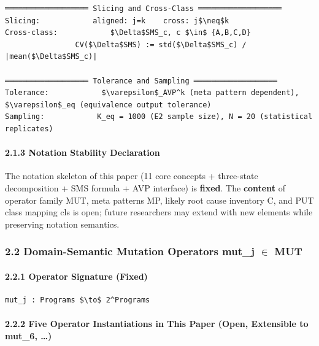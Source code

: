 \documentclass[review,12pt,authoryear]{elsarticle}
\begin{document}
\begin{verbatim}
═══════════════════ Slicing and Cross-Class ═══════════════════
Slicing:            aligned: j=k    cross: j$\neq$k
Cross-class:            $\Delta$SMS_c, c $\in$ {A,B,C,D}
                CV($\Delta$SMS) := std($\Delta$SMS_c) / |mean($\Delta$SMS_c)|

═══════════════════ Tolerance and Sampling ═══════════════════
Tolerance:            $\varepsilon$_AVP^k (meta pattern dependent), $\varepsilon$_eq (equivalence output tolerance)
Sampling:            K_eq = 1000 (E2 sample size), N = 20 (statistical replicates)
\end{verbatim}

\paragraph{2.1.3 Notation Stability
Declaration}\label{notation-stability-declaration}

The notation skeleton of this paper (11 core concepts + three-state
decomposition + SMS formula + AVP interface) is \textbf{fixed}. The
\textbf{content} of operator family MUT, meta patterns MP, likely root
cause inventory C, and PUT class mapping cls is open; future researchers
may extend with new elements while preserving notation semantics.

\subsubsection{2.2 Domain-Semantic Mutation Operators mut\_j $\in$
MUT}\label{domain-semantic-mutation-operators-mut_j-mut}

\paragraph{2.2.1 Operator Signature
(Fixed)}\label{operator-signature-fixed}

\begin{verbatim}
mut_j : Programs $\to$ 2^Programs
\end{verbatim}

\paragraph{2.2.2 Five Operator Instantiations in This Paper (Open,
Extensible to mut\_6,
\ldots)}\label{five-operator-instantiations-in-this-paper-open-extensible-to-mut_6}
\end{document}

